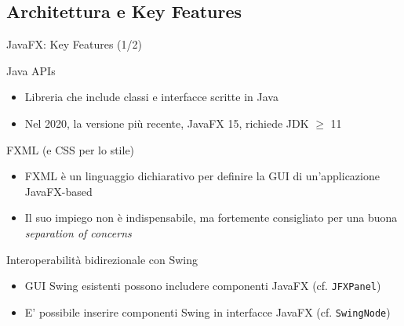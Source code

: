 \documentclass[xcolor=dvipsnames,presentation]{beamer}
\begin{document}

\subsection{Architettura e Key Features}

\begin{frame}{JavaFX: Key Features (1/2)}
\begin{block}{Java APIs}
\begin{itemize}
\item Libreria che include classi e interfacce scritte in Java %
\item Nel 2020, la versione più recente, JavaFX 15, richiede JDK $\geq$ 11
\end{itemize}
\end{block}
%
\begin{block}{FXML (e CSS per lo stile)}
\begin{itemize}
\item FXML è un linguaggio dichiarativo per definire la GUI di un'applicazione JavaFX-based
\item Il suo impiego non è indispensabile, ma fortemente consigliato per una buona \emph{separation of concerns}
\end{itemize}
\end{block}
%
\begin{block}{Interoperabilità bidirezionale con Swing}
\begin{itemize}
\item GUI Swing esistenti possono includere componenti JavaFX (cf. \texttt{JFXPanel})
\item E' possibile inserire componenti Swing in interfacce JavaFX (cf. \texttt{SwingNode})
\end{itemize}
\end{block}
\end{frame}
\end{document}
